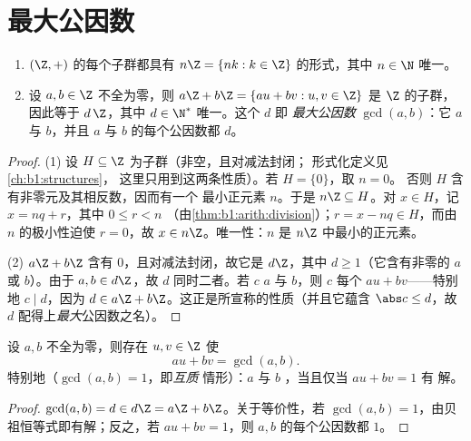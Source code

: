 \section{最大公因数}

\begin{theorem}\label{thm:b1:arith:gcd}
\begin{enumerate}
  \item $(\Z, +)$ 的每个子群都具有 $n\Z = \{nk : k
        \in \Z\}$ 的形式，其中 $n \in \N$ 唯一。
  \item 设 $a, b \in \Z$ 不全为零，则 $a\Z + b\Z = \{au +
        bv : u, v \in \Z\}$ 是 $\Z$ 的子群，因此等于
        $d\,\Z$，其中 $d \in \N^*$ 唯一。这个 $d$ 即
        \emph{最大公因数}
        $\gcd(a, b)$：它 $a$ 与 $b$，并且
        $a$ 与 $b$ 的每个公因数都 $d$。
\end{enumerate}
\end{theorem}

\begin{proof}
(1) 设 $H \subseteq \Z$ 为子群（非空，且对减法封闭；
形式化定义见\cref{ch:b1:structures}，
这里只用到这两条性质）。若 $H = \{0\}$，取 $n = 0$。
否则 $H$ 含有非零元及其相反数，因而有一个
最小正元素 $n$。于是 $n\Z \subseteq H$。对 $x
\in H$，记 $x = nq + r$，其中 $0 \leq r < n$
（由\cref{thm:b1:arith:division}）；$r = x - nq \in H$，而由
$n$ 的极小性迫使 $r = 0$，故 $x \in n\Z$。唯一性：$n$ 是
$n\Z$ 中最小的正元素。

(2) $a\Z + b\Z$ 含有 $0$，且对减法封闭，故它是
$d\Z$，其中 $d \geq 1$（它含有非零的 $a$ 或 $b$）。由于 $a, b
\in d\Z$，故 $d$ 同时二者。若 $c$  $a$ 与 $b$，则 $c$
每个 $au + bv$——特别地 $c \mid d$，因为 $d \in a\Z
+ b\Z$。这正是所宣称的性质（并且它蕴含 $\abs c \leq
d$，故 $d$ 配得上\emph{最大}公因数之名）。
\end{proof}

\begin{corollary}[贝祖恒等式]\label{cor:b1:arith:bezout}
设 $a, b$ 不全为零，则存在 $u, v \in \Z$ 使
\[
au + bv = \gcd(a, b) .
\]
特别地（$\gcd(a,b) = 1$，即\emph{互质}
情形）：$a$ 与 $b$ ，当且仅当 $au + bv = 1$ 有
解。
\end{corollary}

\begin{proof}
$\gcd(a,b) = d \in d\Z = a\Z + b\Z$。关于等价性，若
$\gcd(a,b) = 1$，由贝祖恒等式即有解；反之，若 $au + bv =
1$，则 $a, b$ 的每个公因数都 $1$。
\end{proof}

